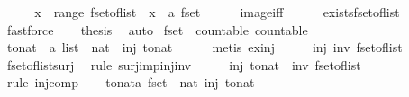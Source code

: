 \begin{isabellebody}
%
\isadelimproof
%
\endisadelimproof
%
\isatagproof
{}\isamarkupfalse%
\ {\isacharminus}\isanewline
\ \ \isamarkupfalse%
\ {\isachardoublequoteopen}x\ {\isasymin}\ range\ fset{\isacharunderscore}of{\isacharunderscore}list{\isachardoublequoteclose}\ \ x\ {\isacharcolon}{\isacharcolon}\ {\isachardoublequoteopen}{\isacharprime}a\ fset{\isachardoublequoteclose}\isanewline
\ \ \ \ \isamarkupfalse%
\ image{\isacharunderscore}iff\isanewline
\ \ \ \ \isamarkupfalse%
\ exists{\isacharunderscore}fset{\isacharunderscore}of{\isacharunderscore}list\ \isamarkupfalse%
\ fastforce\isanewline
\ \ \isamarkupfalse%
\ {\isacharquery}thesis\ \isamarkupfalse%
\ auto\isanewline
{}\isamarkupfalse%
%
\endisatagproof
{\isafoldproof}%
%
\isadelimproof
\isanewline
%
\endisadelimproof
\isanewline
{}\isamarkupfalse%
\ fset\ {\isacharcolon}{\isacharcolon}\ {\isacharparenleft}countable{\isacharparenright}\ countable\isanewline
%
\isadelimproof
%
\endisadelimproof
%
\isatagproof
{}\isamarkupfalse%
\isanewline
\ \ \isamarkupfalse%
\ to{\isacharunderscore}nat\ {\isacharcolon}{\isacharcolon}\ {\isachardoublequoteopen}{\isacharprime}a\ list\ {\isasymRightarrow}\ nat{\isachardoublequoteclose}\ \ {\isachardoublequoteopen}inj\ to{\isacharunderscore}nat{\isachardoublequoteclose}\isanewline
\ \ \ \ \isamarkupfalse%
\ {\isacharparenleft}metis\ ex{\isacharunderscore}inj{\isacharparenright}\isanewline
\ \ \isamarkupfalse%
\ \isamarkupfalse%
\ {\isachardoublequoteopen}inj\ {\isacharparenleft}inv\ fset{\isacharunderscore}of{\isacharunderscore}list{\isacharparenright}{\isachardoublequoteclose}\isanewline
\ \ \ \ \isamarkupfalse%
\ fset{\isacharunderscore}of{\isacharunderscore}list{\isacharunderscore}surj\ \isamarkupfalse%
\ {\isacharparenleft}rule\ surj{\isacharunderscore}imp{\isacharunderscore}inj{\isacharunderscore}inv{\isacharparenright}\isanewline
\ \ \isamarkupfalse%
\ \isamarkupfalse%
\ {\isachardoublequoteopen}inj\ {\isacharparenleft}to{\isacharunderscore}nat\ {\isasymcirc}\ inv\ fset{\isacharunderscore}of{\isacharunderscore}list{\isacharparenright}{\isachardoublequoteclose}\isanewline
\ \ \ \ \isamarkupfalse%
\ {\isacharparenleft}rule\ inj{\isacharunderscore}comp{\isacharparenright}\isanewline
\ \ \isamarkupfalse%
\ {\isachardoublequoteopen}{\isasymexists}to{\isacharunderscore}nat{\isacharcolon}{\isacharcolon}{\isacharprime}a\ fset\ {\isasymRightarrow}\ nat{\isachardot}\ inj\ to{\isacharunderscore}nat{\isachardoublequoteclose}\isanewline

\end{isabellebody}
